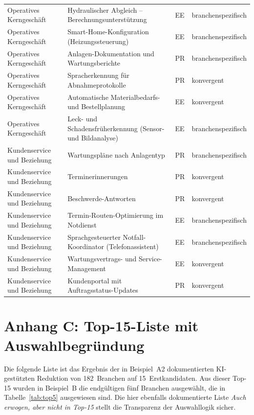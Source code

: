 \documentclass[a4paper,11pt]{article}
\begin{document}
\begin{table}[H]
\begin{tabular}{p{2.8cm}p{6.5cm}p{0.8cm}p{3.5cm}}
Operatives Kerngeschäft & Hydraulischer Abgleich -- Berechnungsunterstützung & EE & branchenspezifisch \\
Operatives Kerngeschäft & Smart-Home-Konfiguration (Heizungssteuerung) & EE & branchenspezifisch \\
Operatives Kerngeschäft & Anlagen-Dokumentation und Wartungsberichte & PR & branchenspezifisch \\
Operatives Kerngeschäft & Spracherkennung für Abnahmeprotokolle & PR & konvergent \\
Operatives Kerngeschäft & Automatische Materialbedarfs- und Bestellplanung & EE & konvergent \\
Operatives Kerngeschäft & Leck- und Schadensfrüherkennung (Sensor- und Bildanalyse) & EE & branchenspezifisch \\
Kundenservice und Beziehung & Wartungspläne nach Anlagentyp & PR & branchenspezifisch \\
Kundenservice und Beziehung & Terminerinnerungen & PR & konvergent \\
Kundenservice und Beziehung & Beschwerde-Antworten & PR & konvergent \\
Kundenservice und Beziehung & Termin-Routen-Optimierung im Notdienst & EE & branchenspezifisch \\
Kundenservice und Beziehung & Sprachgesteuerter Notfall-Koordinator (Telefonassistent) & EE & branchenspezifisch \\
Kundenservice und Beziehung & Wartungsvertrags- und Service-Management & EE & konvergent \\
Kundenservice und Beziehung & Kundenportal mit Auftragsstatus-Updates & PR & konvergent \\
\bottomrule
\end{tabular}
\end{table}

\newpage

\section*{Anhang C: Top-15-Liste mit Auswahlbegründung}

Die folgende Liste ist das Ergebnis der in Beispiel~A2 dokumentierten
KI-gestützten Reduktion von 182~Branchen auf 15~Erstkandidaten. Aus
dieser Top-15 wurden in Beispiel~B die endgültigen fünf Branchen
ausgewählt, die in Tabelle~\ref{tab:top5} ausgewiesen sind. Die hier
ebenfalls dokumentierte Liste \emph{Auch erwogen, aber nicht in
Top-15} stellt die Transparenz der Auswahllogik sicher.
\end{document}

